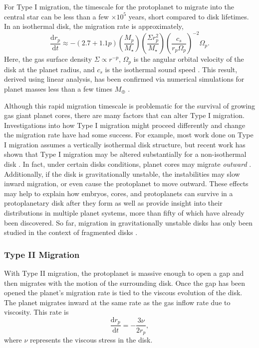 For Type I migration, the timescale for the protoplanet to migrate into the central star can be less than a few $\times 10^5$ years, short compared to disk lifetimes. In an isothermal disk, the migration rate is approximately,
\begin{equation}
\frac{\mathrm{d}r_p}{\mathrm{d}t} \approx -(2.7 + 1.1p)\left(\frac{M_p}{M_\star}\right)\left(\frac{\Sigma r_p^2}{M_\star}\right)\left(\frac{c_s}{r_p \Omega_p}\right)^{-2}\Omega_p.
\label{eq:migrate}
\end{equation}
Here, the gas surface density $\Sigma \propto r^{-p}$, $\Omega_p$ is the angular orbital velocity of the disk at the planet radius, and $c_s$ is the isothermal sound speed \citep{tanaka2002}. This result, derived using linear analysis, has been confirmed via numerical simulations for planet masses less than a few times $M_\oplus$ \citep{dangelo2003,dangelo2008}.

Although this rapid migration timescale is problematic for the survival of growing gas giant planet cores, there are many factors that can alter Type I migration. Investigations into how Type I migration might proceed differently and change the migration rate have had some success. For example, most work done on Type I migration assumes a vertically isothermal disk structure, but recent work has shown that Type I migration may be altered substantially for a non-isothermal disk \citep{paardekooper2006,kley2008}. In fact, under certain disks conditions, planet cores may migrate {\it outward} \citep{kley2008}. Additionally, if the disk is gravitationally unstable, the instabilities may slow inward migration, or even cause the protoplanet to move outward. These effects may help to explain how embryos, cores, and protoplanets can survive in a protoplanetary disk after they form as well as provide insight into their distributions in multiple planet systems, more than fifty of which have already been discovered. So far, migration in gravitationally unstable disks has only been studied in the context of fragmented disks \citep{mayer2004,boss2005}.


\subsubsection{Type II Migration}

With Type II migration, the protoplanet is massive enough to open a gap and then migrates with the motion of the surrounding disk. Once the gap has been opened the planet's migration rate is tied to the viscous evolution of the disk. The planet migrates inward at the same rate as the gas inflow rate due to viscosity. This rate is 
\begin{equation}
\frac{\mathrm{d}r_p}{\mathrm{d}t} =-\frac{3 \nu}{2 r_p},
\label{eq:type2mig}
\end{equation}
where $\nu$ represents the viscous stress in the disk.

